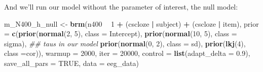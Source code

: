 \documentclass[12pt,ignorenonframetext,aspectratio=169]{beamer}
\newenvironment{Shaded}{\begin{snugshade}}{\end{snugshade}}
\newcommand{\CommentTok}[1]{\textcolor[rgb]{0.56,0.35,0.01}{\textit{#1}}}
\newcommand{\DataTypeTok}[1]{\textcolor[rgb]{0.13,0.29,0.53}{#1}}
\newcommand{\DecValTok}[1]{\textcolor[rgb]{0.00,0.00,0.81}{#1}}
\newcommand{\FloatTok}[1]{\textcolor[rgb]{0.00,0.00,0.81}{#1}}
\newcommand{\KeywordTok}[1]{\textcolor[rgb]{0.13,0.29,0.53}{\textbf{#1}}}
\newcommand{\NormalTok}[1]{#1}
\newcommand{\OperatorTok}[1]{\textcolor[rgb]{0.81,0.36,0.00}{\textbf{#1}}}
\newcommand{\OtherTok}[1]{\textcolor[rgb]{0.56,0.35,0.01}{#1}}
\newcommand{\StringTok}[1]{\textcolor[rgb]{0.31,0.60,0.02}{#1}}
\begin{document}
\begin{frame}[fragile]

And we'll run our model without the parameter of interest, the null model:

\footnotesize

\begin{Shaded}
\begin{Highlighting}[]
\NormalTok{m_N400_h_null <-}\StringTok{ }\KeywordTok{brm}\NormalTok{(n400 }\OperatorTok{~}\StringTok{ }\DecValTok{1} \OperatorTok{+}
\StringTok{                       }\NormalTok{(cscloze }\OperatorTok{|}\StringTok{ }\NormalTok{subject) }\OperatorTok{+}
\StringTok{                       }\NormalTok{(cscloze }\OperatorTok{|}\StringTok{ }\NormalTok{item),}
                     \DataTypeTok{prior =} \KeywordTok{c}\NormalTok{(}\KeywordTok{prior}\NormalTok{(}\KeywordTok{normal}\NormalTok{(}\DecValTok{2}\NormalTok{, }\DecValTok{5}\NormalTok{), }\DataTypeTok{class =}\NormalTok{ Intercept),}
                               \KeywordTok{prior}\NormalTok{(}\KeywordTok{normal}\NormalTok{(}\DecValTok{10}\NormalTok{, }\DecValTok{5}\NormalTok{), }\DataTypeTok{class =}\NormalTok{ sigma),}
                               \CommentTok{## taus in our model}
                               \KeywordTok{prior}\NormalTok{(}\KeywordTok{normal}\NormalTok{(}\DecValTok{0}\NormalTok{, }\DecValTok{2}\NormalTok{), }\DataTypeTok{class =}\NormalTok{ sd),}
                               \KeywordTok{prior}\NormalTok{(}\KeywordTok{lkj}\NormalTok{(}\DecValTok{4}\NormalTok{), }\DataTypeTok{class =}\NormalTok{cor)),}
                     \DataTypeTok{warmup =} \DecValTok{2000}\NormalTok{,}
                     \DataTypeTok{iter =} \DecValTok{20000}\NormalTok{,}
                     \DataTypeTok{control =} \KeywordTok{list}\NormalTok{(}\DataTypeTok{adapt_delta =} \FloatTok{0.9}\NormalTok{),}
                     \DataTypeTok{save_all_pars =} \OtherTok{TRUE}\NormalTok{,}
                     \DataTypeTok{data =}\NormalTok{ eeg_data)}
\end{Highlighting}
\end{Shaded}

\end{frame}
\end{document}
